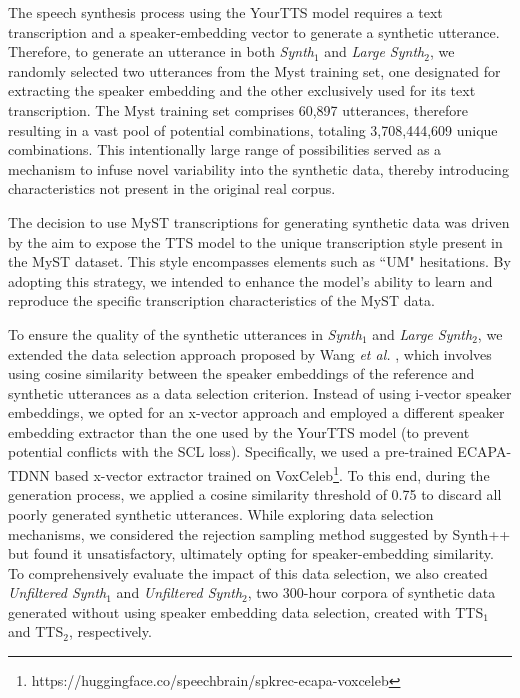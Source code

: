 The speech synthesis process using the YourTTS model requires a text transcription and a speaker-embedding vector to generate a synthetic utterance. Therefore, to generate an utterance in both \textit{Synth$_1$} and \textit{Large Synth$_2$}, we randomly selected two utterances from the Myst training set, one designated for extracting the speaker embedding and the other exclusively used for its text transcription. The Myst training set comprises 60,897 utterances, therefore resulting in a vast pool of potential combinations, totaling 3,708,444,609 unique combinations. This intentionally large range of possibilities served as a mechanism to infuse novel variability into the synthetic data, thereby introducing characteristics not present in the original real corpus.

The decision to use MyST transcriptions for generating synthetic data was driven by the aim to expose the \ac{TTS} model to the unique transcription style present in the MyST dataset. This style encompasses elements such as ``UM" hesitations. By adopting this strategy, we intended to enhance the model's ability to learn and reproduce the specific transcription characteristics of the MyST data.

To ensure the quality of the synthetic utterances in \textit{Synth$_1$} and \textit{Large Synth$_2$}, we extended the data selection approach proposed by Wang \textit{et al.} \cite{wang2021towards}, which involves using cosine similarity between the speaker embeddings of the reference and synthetic utterances as a data selection criterion. Instead of using i-vector speaker embeddings, we opted for an x-vector approach and employed a different speaker embedding extractor than the one used by the YourTTS model (to prevent potential conflicts with the \ac{SCL} loss). Specifically, we used a pre-trained ECAPA-TDNN \cite{desplanques20_interspeech} based x-vector extractor trained on VoxCeleb\footnote{https://huggingface.co/speechbrain/spkrec-ecapa-voxceleb}. To this end, during the generation process, we applied a cosine similarity threshold of 0.75 to discard all poorly generated synthetic utterances. While exploring data selection mechanisms, we considered the rejection sampling method suggested by Synth++ \cite{hu2022synt++} but found it unsatisfactory, ultimately opting for speaker-embedding similarity. To comprehensively evaluate the impact of this data selection, we also created \textit{Unfiltered Synth$_1$} and \textit{Unfiltered Synth$_2$}, two 300-hour corpora of synthetic data generated without using speaker embedding data selection, created with TTS$_1$ and TTS$_2$, respectively.

